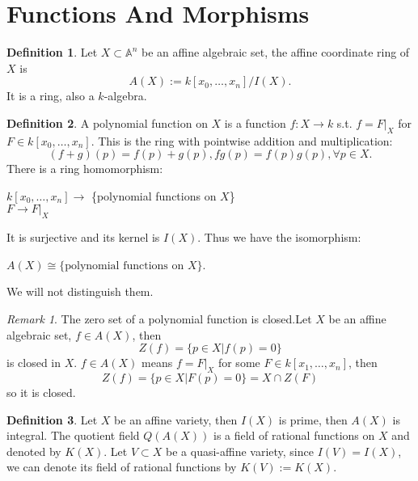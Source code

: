\documentclass{amsart}
\theoremstyle{plain}
\theoremstyle{definition}
\newtheorem{definition}{Definition}
\theoremstyle{remark}
\newtheorem*{remark}{Remark}
\numberwithin{equation}{section}
\begin{document}
\section{Functions And Morphisms}
\begin{definition}
	Let $ X\subset \mathbb{A}^n $ be an affine algebraic set, the affine coordinate ring of $ X $ is 
	\begin{equation}
	A(X):=k[x_0,\dots,x_n]/I(X).
	\end{equation}
	It is a ring, also a $ k $-algebra.
\end{definition}
\begin{definition}
	A polynomial function on $ X $ is a function $ f:X\to k $ s.t. $ f=F|_X $ for $ F\in k[x_0,\dots,x_n] $. This is the ring with pointwise addition and multiplication:
	\begin{equation*}
		(f+g)(p)=f(p)+g(p), fg(p)=f(p)g(p),\forall p\in X.
	\end{equation*}
	There is a ring homomorphism:
	\begin{center}
		$ k[x_0,\dots,x_n] \to $ \{polynomial functions on $ X $\}\\
		$ F\to F|_X $
	\end{center}
	It is surjective and its kernel is $ I(X) $. Thus we have the isomorphism:
	\begin{center}
		$ A(X)\cong \{ \text{polynomial functions on } X \} $.
	\end{center}
	We will not distinguish them.
\end{definition}
\begin{remark}
	The zero set of a polynomial function is closed.Let $ X $ be an affine algebraic set, $ f\in A(X) $, then 
	\begin{equation}
	Z(f)=\{ p\in X|f(p)=0 \}
	\end{equation}
	is closed in $ X $. $ f\in A(X) $ means $ f=F|_X $ for some $ F\in k[x_1,\dots,x_n] $, then 
	\begin{equation}
	Z(f)=\{ p\in X|F(p)=0 \}=X\cap Z(F)
	\end{equation}
	so it is closed.
\end{remark}
\begin{definition}
	Let $ X $ be an affine variety, then $ I(X) $ is prime, then $ A(X) $ is integral.
	The quotient field $ Q(A(X)) $ is a field of rational functions on $ X $ and denoted by $ K(X) $. Let $ V\subset X $ be a quasi-affine variety, since $ I(V)=I(X) $, we can denote its field of rational functions by $ K(V):=K(X) $.
\end{definition}
\end{document}
